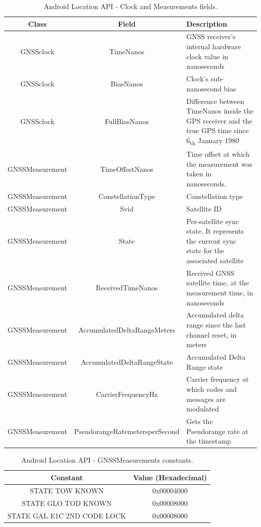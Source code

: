 \begin{table}[H]
	\centering
	\begin{tabular}{|c|c| p{5cm}|}
	\hline
	\textbf{Class} & \textbf{Field} & \textbf{Description}\\
    \hline
	GNSSclock & TimeNanos & GNSS receiver’s internal hardware clock value in nanoseconds\\  
    \hline
	GNSSclock & BiasNanos & Clock’s sub-nanosecond bias\\  
    \hline
	GNSSclock & FullBiasNanos & Difference between TimeNanos inside the	GPS receiver and the true GPS time since 6\textsubscript{th} January 1980\\  
    \hline
	GNSSMeasurement & TimeOffestNanos & Time offset at which the measurement was taken in nanoseconds.\\
    \hline
	GNSSMeasurement & ConstellationType & Constellation type\\  
    \hline
    GNSSMeasurement & Svid & Satellite ID\\  
    \hline
    GNSSMeasurement & State & Per-satellite sync state.	It represents the current	sync state for the associated satellite\\  
    \hline
	GNSSMeasurement & ReceivedTimeNanos & Received GNSS satellite time, at the measurement	time, in nanoseconds\\  
    \hline
	GNSSMeasurement & AccumulatedDeltaRangeMeters & Accumulated delta range since the last channel reset, in meters\\  
    \hline
    GNSSMeasurement & AccumulatedDeltaRangeState & Accumulated Delta Range state\\  \hline
    GNSSMeasurement & CarrierFrequencyHz & Carrier frequency at which codes and messages are modulated\\  
    \hline
    GNSSMeasurement & PseudorangeRatemetersperSecond & Gets the Pseudorange rate at the timestamp\\ 
    \hline
	\end{tabular}
	\caption{Android Location API - Clock and Measurements fields.}
	\label{tab:api_fields}
\end{table}

\begin{table}[H]
	\centering
	\begin{tabular}{| c | c| }
		\hline
		\textbf{Constant} & \textbf{Value (Hexadecimal)}\\
		\hline 
		STATE TOW KNOWN & 0x00004000 \\  
		\hline
		STATE GLO TOD KNOWN & 0x00008000 \\
		\hline
		STATE GAL E1C 2ND CODE LOCK & 0x00008000\\     
		\hline	
	\end{tabular}
	\caption{Android Location API - GNSSMeasurements constants.}
	\label{tab:api_constants}
\end{table}

